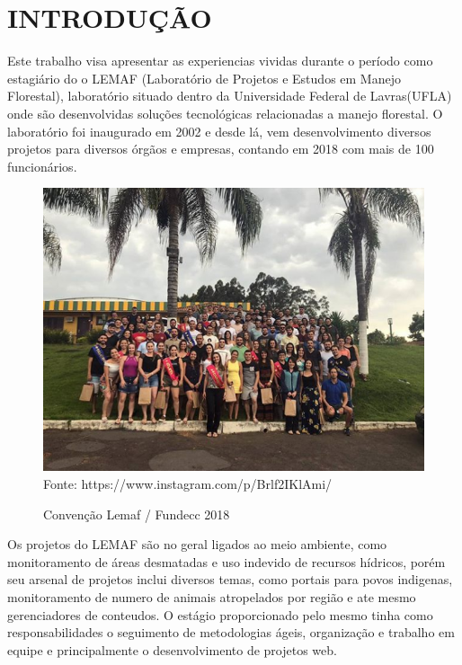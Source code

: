 \chapter{INTRODUÇÃO}

Este trabalho visa apresentar as experiencias vividas durante o período como estagiário do o LEMAF (Laboratório de Projetos e Estudos
em Manejo Florestal), laboratório situado dentro da Universidade Federal de Lavras(UFLA) onde são desenvolvidas soluções tecnológicas relacionadas a manejo florestal.
O laboratório foi inaugurado em 2002 e desde lá, vem desenvolvimento diversos projetos para diversos órgãos e empresas, contando em 2018 com mais de 100 funcionários.

\begin{figure}[H]
\centering
\caption{Convenção Lemaf / Fundecc 2018} %
\includegraphics[scale=1]{convensao}\\  %
{\small Fonte: https://www.instagram.com/p/Brlf2IKlAmi/} %
\label{fig:exemplo} %
\end{figure}

Os projetos do LEMAF são no geral ligados ao meio ambiente, como monitoramento de áreas desmatadas e uso indevido de recursos hídricos, porém seu arsenal de projetos inclui diversos temas, como portais para povos indigenas, monitoramento de numero de animais atropelados por região e ate mesmo gerenciadores de conteudos.   
O estágio proporcionado pelo mesmo tinha como responsabilidades o seguimento de metodologias ágeis, organização e trabalho em equipe e principalmente o desenvolvimento de projetos web.

